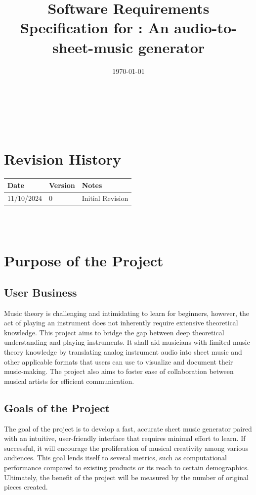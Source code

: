 \documentclass[12pt]{article}
\begin{document}
\title{Software Requirements Specification for \progname: An audio-to-sheet-music generator} 
\author{\authname}
\date{\today}
	
\maketitle
\thispagestyle{empty}

~\newpage


\tableofcontents

~\newpage

\section*{Revision History}

\begin{tabularx}{\textwidth}{p{3cm}p{2cm}X}
\toprule {\textbf{Date}} & {\textbf{Version}} & {\textbf{Notes}}\\
\midrule
11/10/2024 & 0 & Initial Revision\\
\bottomrule
\end{tabularx}

~\\

~\newpage

\section{Purpose of the Project}
\subsection{User Business}
Music theory is challenging and intimidating to learn for beginners, 
however, the act of playing an instrument does not inherently require 
extensive theoretical knowledge. This project aims to bridge the gap 
between deep theoretical understanding and playing instruments. It 
shall aid musicians with limited music theory knowledge by translating 
analog instrument audio into sheet music and other applicable formats 
that users can use to visualize and document their music-making. The 
project also aims to foster ease of collaboration between musical 
artists for efficient communication. 
\subsection{Goals of the Project}
The goal of the project is to develop a fast, accurate sheet music generator 
paired with an intuitive, user-friendly interface that requires minimal effort 
to learn. If successful, it will encourage the proliferation of musical creativity 
among various audiences. This goal lends itself to several metrics, such as 
computational performance compared to existing products or its reach to certain 
demographics. Ultimately, the benefit of the project will be measured by the number 
of original pieces created.
\end{document}
